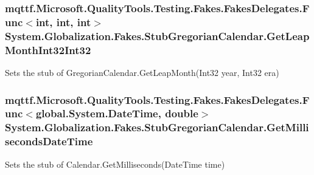 \hypertarget{class_system_1_1_globalization_1_1_fakes_1_1_stub_gregorian_calendar_ac02ae02af28d88a782d037c36c73ca6f}{
\subsubsection[{Get\-Leap\-Month\-Int32\-Int32}]{\setlength{\rightskip}{0pt plus 5cm}mqttf.\-Microsoft.\-Quality\-Tools.\-Testing.\-Fakes.\-Fakes\-Delegates.\-Func$<$int, int, int$>$ System.\-Globalization.\-Fakes.\-Stub\-Gregorian\-Calendar.\-Get\-Leap\-Month\-Int32\-Int32}}\label{class_system_1_1_globalization_1_1_fakes_1_1_stub_gregorian_calendar_ac02ae02af28d88a782d037c36c73ca6f}


Sets the stub of Gregorian\-Calendar.\-Get\-Leap\-Month(\-Int32 year, Int32 era)

\hypertarget{class_system_1_1_globalization_1_1_fakes_1_1_stub_gregorian_calendar_ab39a1e2e4ed917e237e36308d8435abd}{
\subsubsection[{Get\-Milliseconds\-Date\-Time}]{\setlength{\rightskip}{0pt plus 5cm}mqttf.\-Microsoft.\-Quality\-Tools.\-Testing.\-Fakes.\-Fakes\-Delegates.\-Func$<$global.\-System.\-Date\-Time, double$>$ System.\-Globalization.\-Fakes.\-Stub\-Gregorian\-Calendar.\-Get\-Milliseconds\-Date\-Time}}\label{class_system_1_1_globalization_1_1_fakes_1_1_stub_gregorian_calendar_ab39a1e2e4ed917e237e36308d8435abd}


Sets the stub of Calendar.\-Get\-Milliseconds(\-Date\-Time time)

